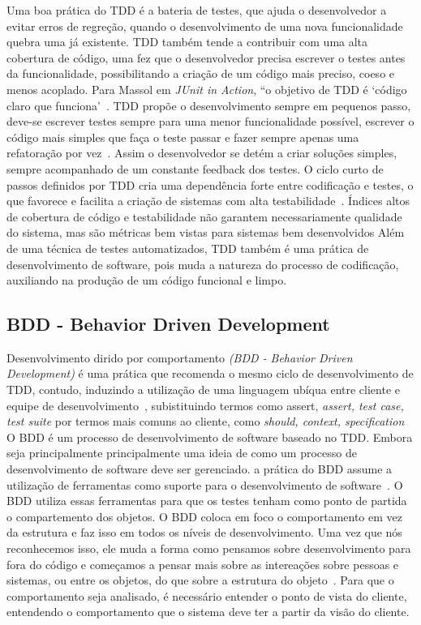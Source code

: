 Uma boa prática do TDD é a bateria de testes, que ajuda o desenvolvedor a evitar erros de regreção, quando o desenvolvimento de uma nova funcionalidade quebra uma já existente. TDD também tende a contribuir com uma alta cobertura de código, uma fez que o desenvolvedor precisa escrever o testes antes da funcionalidade, possibilitando a criação de um código mais preciso, coeso e menos acoplado. 
%
Para Massol em \textit{JUnit in Action}, “o objetivo de TDD é ‘código claro que funciona’~\cite{massol2003}.
%
TDD propõe o desenvolvimento sempre em pequenos passo, deve-se escrever testes sempre para uma menor funcionalidade possível, escrever o código mais simples que faça o teste passar e fazer sempre apenas uma refatoração por vez~\cite{beck2002}. Assim o desenvolvedor se detém a criar soluções simples, sempre acompanhado de um constante feedback dos testes.
%
O ciclo curto de passos definidos por TDD cria uma dependência forte entre codificação e testes, o que favorece e facilita a criação de sistemas com alta testabilidade~\cite{bernardo2011}. Índices altos de cobertura de código e testabilidade não garantem necessariamente qualidade do sistema, mas são métricas bem vistas para sistemas bem desenvolvidos
%
Além de uma técnica de testes automatizados, TDD também é uma prática de desenvolvimento de software, pois muda a natureza do processo de codificação, auxiliando na produção de um código funcional e limpo.
%
\subsection{BDD - Behavior Driven Development}
Desenvolvimento dirido por comportamento \textit{(BDD - Behavior Driven Development)} é uma prática que recomenda o mesmo ciclo de desenvolvimento de TDD, contudo, induzindo a utilização de uma linguagem ubíqua entre cliente e equipe de desenvolvimento~\cite{bernardo2011}, subistituindo termos como assert, \textit{assert, test case, test suite} por termos mais comuns ao cliente, como \textit{should, context, specification}
%
O BDD é um processo de desenvolvimento de software baseado no TDD. Embora seja principalmente principalmente uma ideia de como um processo de desenvolvimento de software deve ser gerenciado. a prática do BDD assume a utilização de ferramentas como suporte para o desenvolvimento de software~\cite{haring2011}. O BDD utiliza essas ferramentas para que os testes tenham como ponto de partida o compartemento dos objetos.
%
O BDD coloca em foco o comportamento em vez da estrutura e faz isso em todos os níveis de desenvolvimento. Uma vez que nós reconhecemos isso, ele muda a forma como pensamos sobre desenvolvimento para fora do código e começamos a pensar mais sobre as intereações sobre pessoas e sistemas, ou entre os objetos, do que sobre a estrutura do objeto~\cite{chelimsky2010}.
%
Para que o comportamento seja analisado, é necessário entender o ponto de vista do cliente, entendendo o comportamento que o sistema deve ter a partir da visão do cliente. 
%
